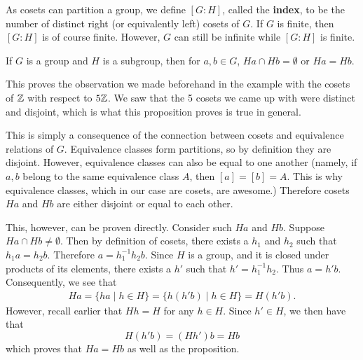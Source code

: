     As cosets can partition a group, we define $[G:H]$, called the
    \textbf{index}, to be the
    number of distinct right (or equivalently left) cosets of $G$.
    If $G$ is finite, then $[G:H]$ is of course finite. However, $G$
    can still be infinite while $[G:H]$ is finite.

    \begin{proposition}
        If $G$ is a group and $H$ is a subgroup, then for $a, b \in
        G$, $Ha \cap Hb = \emptyset$ or $Ha = Hb$.
    \end{proposition}

    This proves the observation we made beforehand in the example with
    the cosets of $\mathbb{Z}$ with respect to $5\mathbb{Z}$. We saw that the 5 cosets
    we came up with were distinct and disjoint, which is what this
    proposition proves is true in general.

    \begin{prf}
        This is simply a consequence of the connection between cosets
        and 
        equivalence relations of $G$. Equivalence classes form partitions,
        so by definition they are disjoint. However, equivalence classes
        can also be equal to one another (namely, if $a, b$ belong to the
        same equivalence class $A$, then $[a] = [b] = A$. This is why
        equivalence classes, which in our case are cosets, are
        awesome.) Therefore cosets $Ha$ and $Hb$ are either disjoint or
        equal to each other.

        This, however, can be proven directly. Consider such $Ha$ and
        $Hb$. Suppose $Ha \cap Hb \ne \emptyset$. Then by definition
        of cosets, there exists a $h_1$ and $h_2$ such that $h_1a = h_2b$.
        Therefore $a = h_1^{-1}h_2b$. Since $H$ is a group, and it is
        closed under products of its elements, there exists a
        $h'$ such that $h'= h_1^{-1}h_2$. Thus $a = h'b$.
        Consequently, we see that 
        \begin{align*}
            Ha = \{ha \mid h \in H\} = \{h(h'b) \mid h \in H\} = H(h'b).
        \end{align*}
        However, recall earlier that $Hh = H$ for any $h \in H$. Since
        $h' \in H$, we then have that 
        \[
            H(h'b) = (Hh')b = Hb
        \]
        which proves that $Ha = Hb$ as well as the proposition.
    \end{prf}

